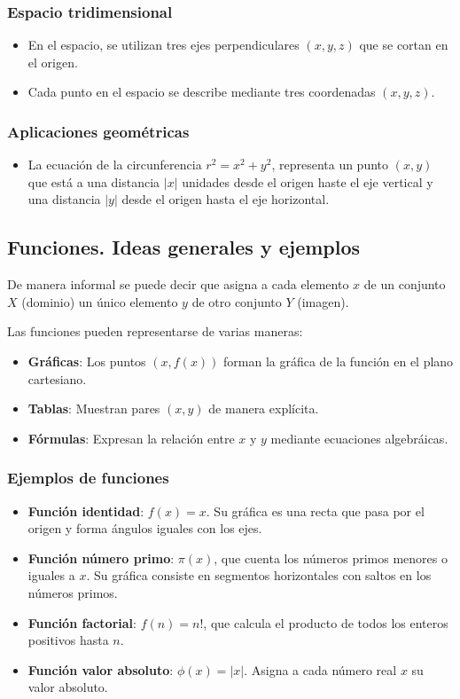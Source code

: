 \subsubsection*{Espacio tridimensional}
\begin{itemize}
    \item En el espacio, se utilizan tres ejes perpendiculares $(x, y, z)$ que se cortan en el origen.
    \item Cada punto en el espacio se describe mediante tres coordenadas $(x, y, z)$.
\end{itemize}

\subsubsection*{Aplicaciones geométricas}
\begin{itemize}
    \item La ecuación de la circunferencia $r^2 = x^2 + y^2$, representa un punto $(x, y)$ que está a una distancia $|x|$ unidades desde el origen haste el eje vertical y una distancia $|y|$ desde el origen hasta el eje horizontal.
\end{itemize}

\subsection*{Funciones. Ideas generales y ejemplos}

De manera informal se puede decir que asigna a cada elemento $x$ de un conjunto $X$ (dominio) un único elemento $y$ de otro conjunto $Y$ (imagen).

Las funciones pueden representarse de varias maneras:
\begin{itemize}
    \item \textbf{Gráficas}: Los puntos $(x, f(x))$ forman la gráfica de la función en el plano cartesiano.
    \item \textbf{Tablas}: Muestran pares $(x, y)$ de manera explícita.
    \item \textbf{Fórmulas}: Expresan la relación entre $x$ y $y$ mediante ecuaciones algebráicas.
\end{itemize}

\subsubsection*{Ejemplos de funciones}
\begin{itemize}
    \item \textbf{Función identidad}: $f(x) = x$. Su gráfica es una recta que pasa por el origen y forma ángulos iguales con los ejes.
    \item \textbf{Función número primo}: $\pi(x)$, que cuenta los números primos menores o iguales a $x$. Su gráfica consiste en segmentos horizontales con saltos en los números primos.
    \item \textbf{Función factorial}: $f(n) = n!$, que calcula el producto de todos los enteros positivos hasta $n$.
    \item \textbf{Función valor absoluto}: $\phi(x) = |x|$. Asigna a cada número real $x$ su valor absoluto.
\end{itemize}

